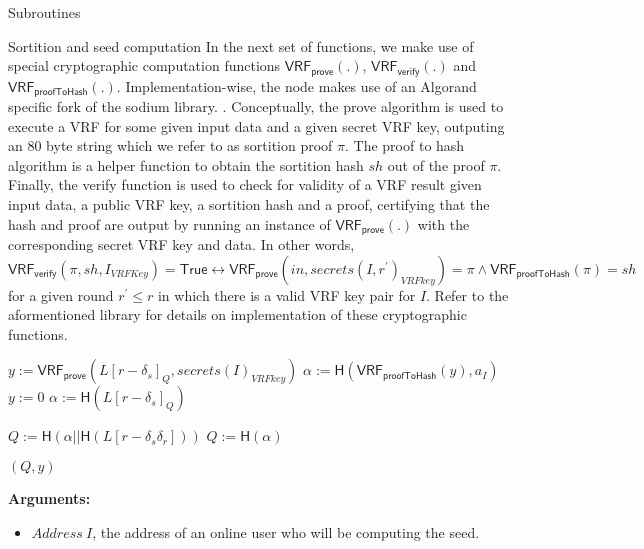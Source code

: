 \documentclass[10pt,a4paper]{article}
\begin{document}
\begin{section}{Subroutines}
\begin{subsection}{Sortition and seed computation}
In the next set of functions, we make use of special cryptographic computation 
functions $\mathsf{VRF_{prove}}(.)$, $\mathsf{VRF_{verify}}(.)$ and $\mathsf{VRF_{proofToHash}}(.)$.
Implementation-wise, the node makes use of an Algorand specific fork of the sodium library.
. 
Conceptually, the prove algorithm is used to execute a VRF for some given input
data and a given secret VRF key, outputing an 80 byte string which we refer to as sortition proof $\pi$. 
The proof to hash algorithm is a helper function to obtain the sortition hash $sh$ out of the proof
$\pi$. Finally, the verify function is used to check for validity of a VRF result given input data,
a public VRF key, a sortition hash and a proof, certifying that the hash and proof are output by running
an instance of $\mathsf{VRF_{prove}}(.)$ with the corresponding secret VRF key and data.
In other words, \\
$\mathsf{VRF_{verify}}(\pi, sh, I_{VRFKey}) = \mathsf{True} \leftrightarrow 
\mathsf{VRF_{prove}}(in, secrets(I,r^\prime)_{VRFkey}) = \pi \land \mathsf{VRF_{proofToHash}}(\pi) = sh$ \\
for a given round $r^\prime \leq r$ in which there is a valid VRF key pair for $I$.
Refer to the aformentioned library for details on implementation of these cryptographic functions.

\begin{algorithm}[H]
    \caption{\underline{Compute Seed And Proof}}
    \label{algo:compute-seed}
    \begin{algorithmic}[1]
             \State $y := \mathsf{VRF_{prove}}(L[r-\delta_s]_Q, secrets(I)_{VRFkey})$
             \State $\alpha := \mathsf{H}(\mathsf{VRF_{proofToHash}}(y), a_I)$
        \Else
            \State $y := 0$
            \State $\alpha := \mathsf{H}(L[r-\delta_s]_Q)$
        \EndIf

            \State $Q := \mathsf{H}(\alpha||\mathsf{H}(L[r-\delta_s\delta_r]))$
        \Else
            \State $Q := \mathsf{H}(\alpha)$
        \EndIf

         \State \Return $(Q, y)$
    \EndFunction
    \end{algorithmic}
\end{algorithm}


\noindent \textbf{Arguments:}
\begin{itemize}
    \item $Address \ I$, the address of an online user who will be computing the seed.
  \end{itemize}



\end{subsection}
\end{section}
\end{document}
